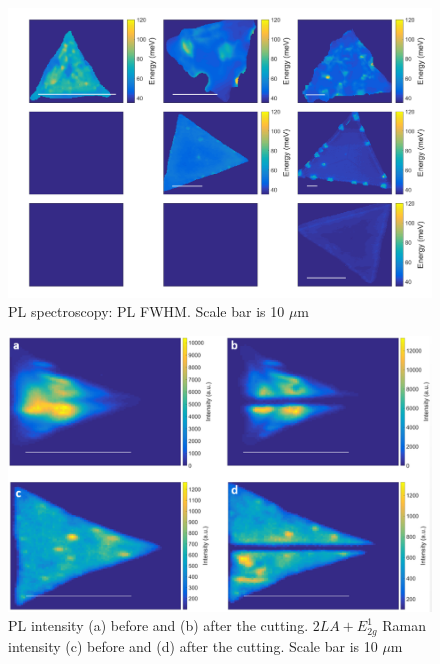 \documentclass[12pt]{article}
\begin{document}
\begin{figure}[h]
\begin{center}
\includegraphics[scale=0.3]{PaperSIMapsWidthPL.png}
\caption{PL spectroscopy: PL FWHM. Scale bar is 10 $\mu$m}
\label{fig:PaperSIMapsWidthPL}
\end{center}
\end{figure}

\begin{figure}[h]
\begin{center}
\includegraphics[scale=0.3]{PaperSIMapsCutting.png}
\caption{PL intensity (a) before and (b) after the cutting. $2LA+E^1_{2g}$ Raman intensity (c) before and (d) after the cutting. Scale bar is 10 $\mu$m}
\label{fig:PaperSIMapsCutting}
\end{center}
\end{figure}
\end{document}
